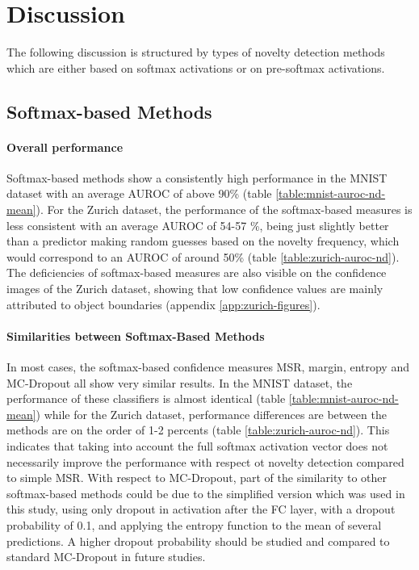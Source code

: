 \documentclass[10pt]{article}
\begin{document}
\section{Discussion}
\label{sec:discussion}
The following discussion is structured by types of novelty detection methods which are either based on softmax activations or on pre-softmax activations.

\subsection{Softmax-based Methods}
\paragraph{Overall performance}  Softmax-based methods show a consistently high performance in the \gls{MNIST} dataset with an average \gls{AUROC} of above 90\% (table \ref{table:mnist-auroc-nd-mean}). For the Zurich dataset, the performance of the softmax-based measures is less consistent with an average \gls{AUROC} of 54-57 \%, being just slightly better than a predictor making random guesses based on the novelty frequency, which would correspond to an \gls{AUROC} of around 50\% (table \ref{table:zurich-auroc-nd}). The deficiencies of softmax-based measures are also visible on the confidence images of the Zurich dataset, showing that low confidence values are mainly attributed to object boundaries (appendix \ref{app:zurich-figures}).

\paragraph{Similarities between Softmax-Based Methods }  In most cases, the softmax-based confidence measures \gls{MSR}, margin, entropy and \gls{MC-Dropout} all show very similar results. In the MNIST dataset, the performance of these classifiers is almost identical (table \ref{table:mnist-auroc-nd-mean}) while for the Zurich dataset, performance differences are between the methods are on the order of 1-2 percents (table \ref{table:zurich-auroc-nd}). This indicates that taking into account the full softmax activation vector does not necessarily improve the performance with respect ot novelty detection compared to simple \gls{MSR}. With respect to \gls{MC-Dropout}, part of the similarity to other softmax-based methods could be due to the simplified version which was used in this study, using only dropout in activation after the \gls{FC} layer, with a dropout probability of 0.1, and applying the entropy function to the mean of several predictions. A higher dropout probability should be studied and compared to standard \gls{MC-Dropout} in future studies. 
\end{document}
